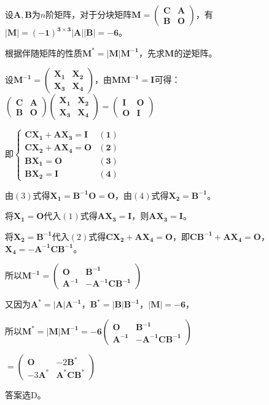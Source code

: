 \begin{solution}
    设\(\mathbf{A,B}\)为\(n\)阶矩阵，对于分块矩阵\(\mathbf{M=\left(\begin{array}{ll}C&A\\B&O\end{array}\right)}\)，有\(\mathbf{\vert M\vert=(-1)^{3\times3}\vert A\vert\vert B\vert=-6}\)。
    
    根据伴随矩阵的性质\(\mathbf{M^{*}=\vert M\vert M^{-1}}\)，先求\(\mathbf{M}\)的逆矩阵。
    
    设\(\mathbf{M^{-1}=\left(\begin{array}{cc}X_{1}&X_{2}\\X_{3}&X_{4}\end{array}\right)}\)，由\(\mathbf{MM^{-1}=I}\)可得：
    \(\mathbf{\left(\begin{array}{ll}C&A\\B&O\end{array}\right)\left(\begin{array}{ll}X_{1}&X_{2}\\X_{3}&X_{4}\end{array}\right)=\left(\begin{array}{ll}I&O\\O&I\end{array}\right)}\)
    
    即\(\mathbf{\begin{cases}CX_{1}+AX_{3}=I&(1)\\CX_{2}+AX_{4}=O&(2)\\BX_{1}=O&(3)\\BX_{2}=I&(4)\end{cases}}\)
    
    由\((3)\)式得\(\mathbf{X_{1}=B^{-1}O = O}\)，由\((4)\)式得\(\mathbf{X_{2}=B^{-1}}\)。
    
    将\(\mathbf{X_{1}=O}\)代入\((1)\)式得\(\mathbf{AX_{3}=I}\)，则\(\mathbf{AX_{3}=I}\)。
    
    将\(\mathbf{X_{2}=B^{-1}}\)代入\((2)\)式得\(\mathbf{CX_{2}+AX_{4}=O}\)，即\(\mathbf{CB^{-1}+AX_{4}=O}\)，\(\mathbf{X_{4}=-A^{-1}CB^{-1}}\)。
    
    所以\(\mathbf{M^{-1}=\left(\begin{array}{cc}O&B^{-1}\\A^{-1}&-A^{-1}CB^{-1}\end{array}\right)}\)
    
    又因为\(\mathbf{A^{*}=\vert A\vert A^{-1}}\)，\(\mathbf{B^{*}=\vert B\vert B^{-1}}\)，\(\mathbf{\vert M\vert=-6}\)，\par 所以\(\mathbf{M^{*}=\vert M\vert M^{-1}=-6\left(\begin{array}{cc}O&B^{-1}\\A^{-1}&-A^{-1}CB^{-1}\end{array}\right)}\)
    
    \(=\left(\begin{array}{cc}\mathbf{O}& - 2\mathbf{B}^{*}\\-3\mathbf{A}^{*}&\mathbf{A}^{*}\mathbf{C}\mathbf{B}^{*}\end{array}\right)\)
    
    答案选D。
\end{solution}
